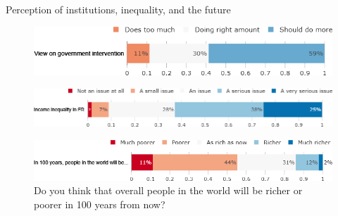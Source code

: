 \begin{framefont}{\small}
\begin{frame}{Perception of institutions, inequality, and the future}%
\vspace{-.2cm}
\begin{figure}[h!]
\caption{Some people think the government is trying to do too many things that should be left to individuals and businesses. Others think that government should do more to solve our country's problems.
Which come closer to your own view? }
\includegraphics[width=.61\paperwidth]{../figures/FR/view_govt_FR.png} \\
\vspace{.1cm}
\caption{How big of an issue do you think income inequality is in France?}
\includegraphics[width=.61\paperwidth]{../figures/FR/problem_inequality_FR.png}\\
\vspace{.1cm}
\caption{Do you think that overall people in the world will be richer or poorer in 100 years from now?}
\includegraphics[width=.61\paperwidth]{../figures/FR/future_richness_FR.png}
\end{figure}
\end{frame}



\end{framefont}
